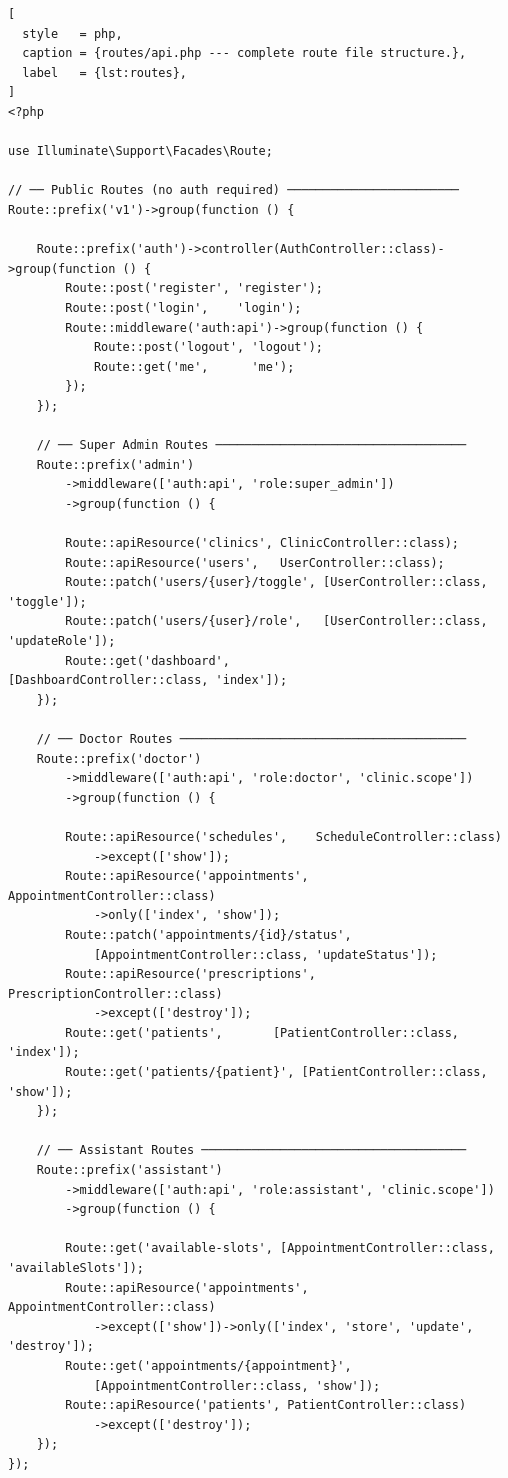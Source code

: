 \begin{lstlisting}[
  style   = php,
  caption = {routes/api.php --- complete route file structure.},
  label   = {lst:routes},
]
<?php

use Illuminate\Support\Facades\Route;

// ── Public Routes (no auth required) ────────────────────────
Route::prefix('v1')->group(function () {

    Route::prefix('auth')->controller(AuthController::class)->group(function () {
        Route::post('register', 'register');
        Route::post('login',    'login');
        Route::middleware('auth:api')->group(function () {
            Route::post('logout', 'logout');
            Route::get('me',      'me');
        });
    });

    // ── Super Admin Routes ───────────────────────────────────
    Route::prefix('admin')
        ->middleware(['auth:api', 'role:super_admin'])
        ->group(function () {

        Route::apiResource('clinics', ClinicController::class);
        Route::apiResource('users',   UserController::class);
        Route::patch('users/{user}/toggle', [UserController::class, 'toggle']);
        Route::patch('users/{user}/role',   [UserController::class, 'updateRole']);
        Route::get('dashboard',             [DashboardController::class, 'index']);
    });

    // ── Doctor Routes ────────────────────────────────────────
    Route::prefix('doctor')
        ->middleware(['auth:api', 'role:doctor', 'clinic.scope'])
        ->group(function () {

        Route::apiResource('schedules',    ScheduleController::class)
            ->except(['show']);
        Route::apiResource('appointments', AppointmentController::class)
            ->only(['index', 'show']);
        Route::patch('appointments/{id}/status',
            [AppointmentController::class, 'updateStatus']);
        Route::apiResource('prescriptions', PrescriptionController::class)
            ->except(['destroy']);
        Route::get('patients',       [PatientController::class, 'index']);
        Route::get('patients/{patient}', [PatientController::class, 'show']);
    });

    // ── Assistant Routes ─────────────────────────────────────
    Route::prefix('assistant')
        ->middleware(['auth:api', 'role:assistant', 'clinic.scope'])
        ->group(function () {

        Route::get('available-slots', [AppointmentController::class, 'availableSlots']);
        Route::apiResource('appointments', AppointmentController::class)
            ->except(['show'])->only(['index', 'store', 'update', 'destroy']);
        Route::get('appointments/{appointment}',
            [AppointmentController::class, 'show']);
        Route::apiResource('patients', PatientController::class)
            ->except(['destroy']);
    });
});
\end{lstlisting}


